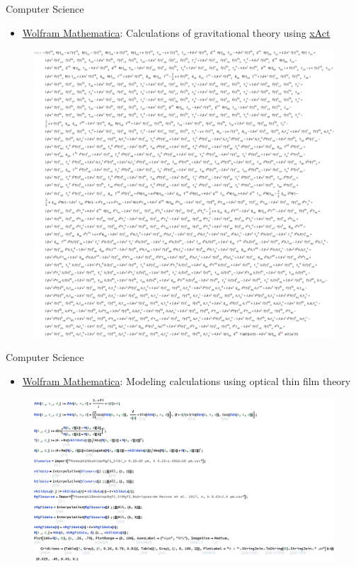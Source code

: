 \documentclass[9pt,aspectratio=169,hyperref=colorlinks]{beamer}
\begin{document}
\begin{frame}{Computer Science}
    \begin{itemize}
        \item \href{https://www.wolfram.com/mathematica/}{Wolfram Mathematica}: Calculations of gravitational theory using \href{http://xact.es/index.html}{xAct}
    \end{itemize}

    \begin{figure}
        \centering
        \includegraphics[scale=0.32]{CV/figs/2211.13233.2.pdf}
    \end{figure}
\end{frame}

\begin{frame}{Computer Science}
    \begin{itemize}
        \item \href{https://www.wolfram.com/mathematica/}{Wolfram Mathematica}: Modeling calculations using optical thin film theory
    \end{itemize}

    \begin{figure}
        \centering
        \includegraphics[scale=0.31]{CV/figs/3.1.pdf}
    \end{figure}
\end{frame}
\end{document}
